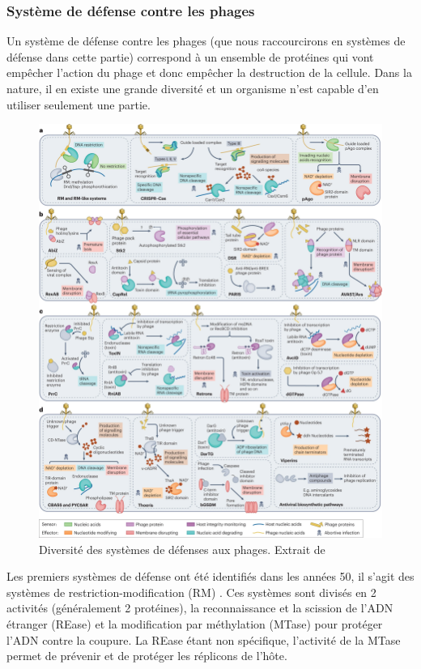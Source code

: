 \subsubsection{Système de défense contre les phages}

Un système de défense contre les phages (que nous raccourcirons en systèmes de défense dans cette partie) correspond à un ensemble de protéines qui vont empêcher l'action du phage et donc empêcher la destruction de la cellule. Dans la nature, il en existe une grande diversité et un organisme n'est capable d'en utiliser seulement une partie. 
\begin{figure}[htbp]
    \centering
    \includegraphics[width=\textwidth]{images/defensesys.png}
    \caption[Diversité des systèmes de défenses aux phages]{Diversité des systèmes de défenses aux phages. Extrait de \cite{georjon_highly_2023}}
    \label{fig:defsys}
\end{figure}

Les premiers systèmes de défense ont été identifiés dans les années 50, il s'agit des systèmes de restriction-modification (RM) \cite{bertani_host_1953}. Ces systèmes sont divisés en 2 activités (généralement 2 protéines), la reconnaissance et la scission de l'ADN étranger (REase) et la modification par méthylation (MTase) pour protéger l'ADN contre la coupure. La REase étant non spécifique, l'activité de la MTase permet de prévenir et de protéger les réplicons de l'hôte. 

